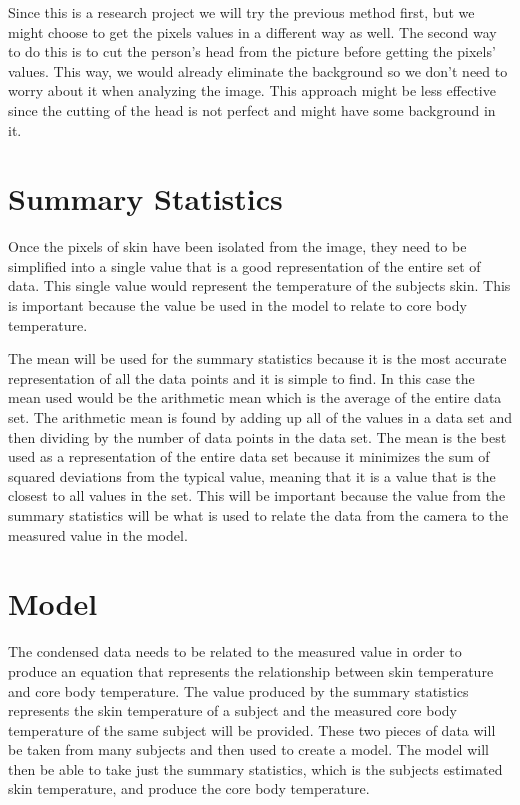 \documentclass[onecolumn, draftclsnofoot,10pt, compsoc]{IEEEtran}
\begin{document}
Since this is a research project we will try the previous method first, but we might choose to get the pixels values in a different way as well. The second way to do this is to cut the person’s head from the picture before getting the pixels’ values. This way, we would already eliminate the background so we don’t need to worry about it when analyzing the image. This approach might be less effective since the cutting of the head is not perfect and might have some background in it. 


\section{Summary Statistics}

Once the pixels of skin have been isolated from the image, they need to be simplified into a single value that is a good representation of the entire set of data. This single value would represent the temperature of the subjects skin. This is important because the value be used in the model to relate to core body temperature. 

The mean will be used for the summary statistics because it is the most accurate representation of all the data points and it is simple to find. In this case the mean used would be the arithmetic mean which is the average of the entire data set. The arithmetic mean is found by adding up all of the values in a data set and then dividing by the number of data points in the data set. The mean is the best used as a representation of the entire data set because it minimizes the sum of squared deviations from the typical value, meaning that it is a value that is the closest to all values in the set. This will be important because the value from the summary statistics will be what is used to relate the data from the camera to the measured value in the model.

\section{Model}

The condensed data needs to be related to the measured value in order to produce an equation that represents the relationship between skin temperature and core body temperature. The value produced by the summary statistics represents the skin temperature of a subject and the measured core body temperature of the same subject will be provided. These two pieces of data will be taken from many subjects and then used to create a model. The model will then be able to take just the summary statistics, which is the subjects estimated skin temperature, and produce the core body temperature.
\end{document}
